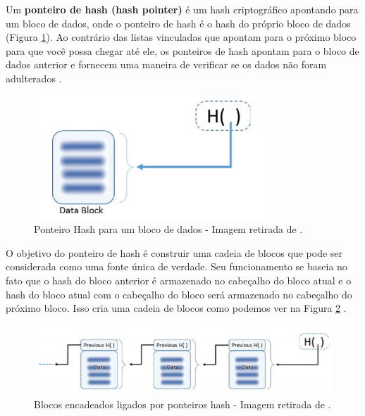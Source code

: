             Um \textbf{ponteiro de hash (hash pointer)} é um hash criptográfico apontando para um bloco de dados, onde o ponteiro de hash é o hash do próprio bloco de dados (Figura \ref{fig:hash_pointer}). Ao contrário das listas vinculadas que apontam para o próximo bloco para que você possa chegar até ele, os ponteiros de hash apontam para o bloco de dados anterior e fornecem uma maneira de verificar se os dados não foram adulterados  \cite{beginnig_blockchain_bikramaditya}.
            
                \begin{figure}[h]
                     \centering
                     \includegraphics[scale=0.8]{figuras/capitulo_2/hash_pointer.png}
                     \caption{Ponteiro Hash para um bloco de dados - Imagem retirada de \cite{beginnig_blockchain_bikramaditya}.}
                     \label{fig:hash_pointer}
                \end{figure}
            
            O objetivo do ponteiro de hash é construir uma cadeia de blocos que pode ser considerada como uma fonte única de verdade. Seu funcionamento se baseia no fato que o hash do bloco anterior é armazenado no cabeçalho do bloco atual e o hash do bloco atual com o cabeçalho do bloco será armazenado no cabeçalho do próximo bloco. Isso cria uma cadeia de blocos como podemos ver na Figura \ref{fig:blocks_linked_hash_pointers}  \cite{beginnig_blockchain_bikramaditya}.
            
                \begin{figure}[h]
                     \centering
                     \includegraphics[scale=0.8]{figuras/capitulo_2/blocks_linked_hash_pointers.png}
                     \caption{Blocos encadeados ligados por ponteiros hash - Imagem retirada de \cite{beginnig_blockchain_bikramaditya}.}
                     \label{fig:blocks_linked_hash_pointers}
                \end{figure}


